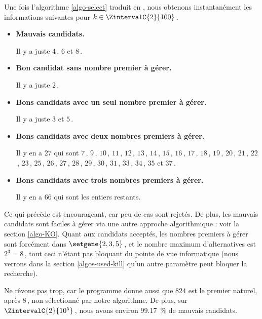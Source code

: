 Une fois l'algorithme \ref{algo-select} traduit en \python, nous obtenons instantanément les informations suivantes pour $k \in \ZintervalC{2}{100}$\,.
%
\begin{itemize}
	\item \textbf{Mauvais candidats.}
	
	\noindent
	Il y a juste $4$\,, $6$ et $8$\,.
	
	\item \textbf{Bon candidat sans nombre premier à gérer.}
	
	\noindent
	Il y a juste $2$\,.
	
	
	\item \textbf{Bons candidats avec un seul nombre premier à gérer.}
	
	\noindent
	Il y a juste $3$ et $5$\,.
	
	\item \textbf{Bons candidats avec deux nombres premiers à gérer.}
	
	\noindent
	Il y en a 27 qui sont $7$\,, $9$\,, $10$\,, $11$\,, $12$\,, $13$\,, $14$\,, $15$\,, $16$\,, $17$\,, $18$\,, $19$\,, $20$\,, $21$\,, $22$\,, $23$\,, $25$\,, $26$\,, $27$\,, $28$\,, $29$\,, $30$\,, $31$\,, $33$\,, $34$\,, $35$ et $37$\,.

	\item\textbf{Bons candidats avec trois nombres premiers à gérer.}
	
	\noindent
	Il y en a 66 qui sont les entiers restants.
\end{itemize}


Ce qui précède est encourageant, car peu de cas sont rejetés.
De plus, les mauvais candidats sont faciles à gérer via une autre approche algorithmique : voir la section \ref{algo-KO}.
Quant aux candidats acceptés, les nombres premiers à gérer sont forcément dans $\setgene{2, 3, 5}$\,, et le nombre maximum d'alternatives est $2^3 = 8$\,, tout ceci n'étant pas bloquant du pointe de vue informatique (nous verrons dans la section \ref{algos-used-kill} qu'un autre paramètre peut bloquer la recherche).
 



\begin{remark}
	Ne rêvons pas trop, car le programme donne aussi que $824$ est le premier naturel, après $8$\,, non sélectionné par notre algorithme.
	De plus, sur $\ZintervalC{2}{10^5}$\,, nous avons environ \qty{99.17}{\percent} de mauvais candidats.
\end{remark}

